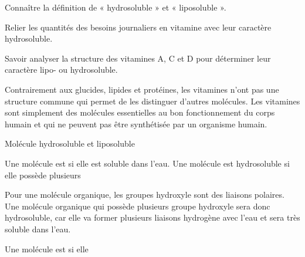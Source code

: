 \teteTermStssBiom
{}

\begin{objectifs}
  \item Connaître la définition de « hydrosoluble » et « liposoluble ».
  \item Relier les quantités des besoins journaliers en vitamine avec leur caractère hydrosoluble.
  \item Savoir analyser la structure des vitamines A, C et D pour déterminer leur caractère lipo- ou hydrosoluble.
\end{objectifs}

\begin{contexte}
  Contrairement aux glucides, lipides et protéines, les vitamines n'ont pas une structure commune qui permet de les distinguer d'autres molécules.
  Les vitamines sont simplement des molécules essentielles au bon fonctionnement du corps humain et qui ne peuvent pas être synthétisée par un organisme humain.
  
\end{contexte}


\begin{doc}{Molécule hydrosoluble et liposoluble}
  \begin{importants}
    Une molécule est  si elle est soluble dans l'eau.
    Une molécule est hydrosoluble si elle possède plusieurs 
  \end{importants}
  
  Pour une molécule organique, les groupes hydroxyle  sont des liaisons polaires.
  Une molécule organique qui possède plusieurs groupe hydroxyle sera donc hydrosoluble, car elle va former plusieurs liaisons hydrogène avec l'eau et sera très soluble dans l'eau.

  \begin{importants}
    Une molécule est  si elle 
  \end{importants}
\end{doc}

